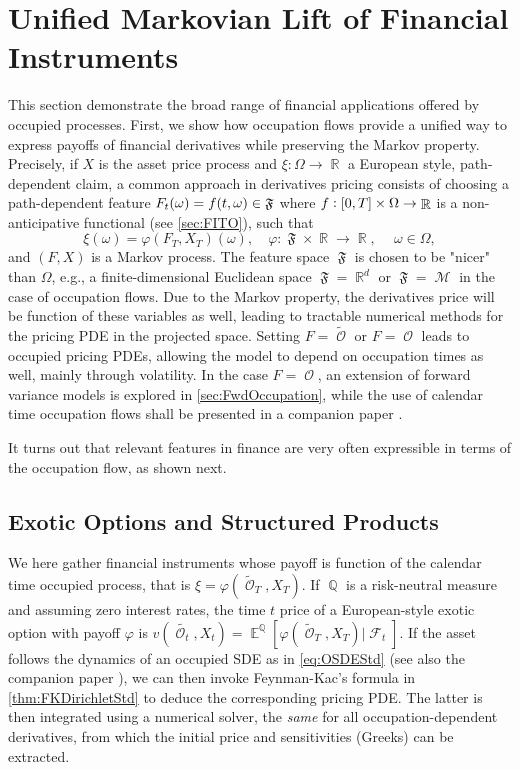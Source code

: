 \documentclass[11pt]{article}
\theoremstyle{plain}
\theoremstyle{definition}
\DeclareMathOperator{\E}{\mathbb{E}}
\DeclareMathOperator{\Q}{\mathbb{Q}}
\DeclareMathOperator{\R}{\mathbb{R}}
\DeclareMathOperator{\calF}{\mathcal{F}}
\DeclareMathOperator{\calM}{\mathcal{M}}
\DeclareMathOperator{\calO}{\mathcal{O}}
\DeclareMathOperator{\frakF}{\mathfrak{F}}
\begin{document}
\section{Unified Markovian  Lift of Financial Instruments}\label{sec:finApp}
This section  demonstrate the 
broad range of financial applications  offered by occupied processes. 
First, we show how occupation flows provide a unified way to express payoffs of financial derivatives  while preserving the Markov property.  
Precisely, if $X$ is the asset price process and $\xi:\Omega \to \R$ a European style, path-dependent claim, a common approach in derivatives pricing  consists of choosing a path-dependent feature $F_t(\omega) = \textnormal{f}(t,\omega) \in \frakF$ where $\textnormal{f}: [0,T]\times \Omega \to \R$ is a non-anticipative functional (see \cref{sec:FITO}), such that 
\begin{equation}
    \xi(\omega)  = \varphi(F_T,X_T)(\omega),  \quad \varphi: \frakF \times \R \to \R, \quad \ \omega \in \Omega, 
\end{equation}
and $ (F,X)$ is a Markov process. 
The feature space $\frakF$ is chosen to be "nicer" than $\Omega$, e.g., a finite-dimensional Euclidean space $\frakF = \R^d$  or $\frakF = \calM$ in the case of occupation flows. 
Due to the Markov property, the derivatives price will be function of these variables as well, leading to  tractable numerical  methods for  the  pricing PDE in the projected space.  
Setting $F = \tilde{\calO}$ or $F = \calO$  leads to occupied pricing PDEs, allowing  the model to depend on occupation times as well, mainly  through volatility. 
In the case $F = \calO$,  
an extension of forward variance models is explored in \cref{sec:FwdOccupation}, while the use of calendar time  occupation flows shall be presented in a companion paper \cite{TissotLOV}. 

It turns out that relevant features in finance are very often expressible in terms of the  occupation flow, 
as shown next. 


\subsection{Exotic Options and Structured Products}\label{sec:occPayoffs}


We here gather financial instruments  
whose payoff  is function of 
the calendar time occupied process, that is 
$\xi = \varphi(\tilde{\calO}_T,X_T)$.  
If $\Q$ is a risk-neutral measure and assuming zero interest rates,  the time $t$   price of a European-style exotic option with payoff $\varphi$   is  $v(\tilde{\calO_t},X_t) = \E^{\Q}[\varphi(\tilde{\calO}_T,X_T)  |  \calF_t ]$. If the asset follows the dynamics of an occupied SDE as in \eqref{eq:OSDEStd} (see also the companion paper \cite{TissotLOV}), we   can then invoke Feynman-Kac's formula in \cref{thm:FKDirichletStd} to deduce the corresponding pricing PDE. The latter is then integrated using a numerical solver, the \emph{same} for all occupation-dependent derivatives, from which the initial price and  sensitivities (Greeks) can be extracted. 
\end{document}
